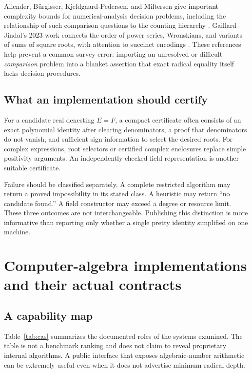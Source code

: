 \documentclass[11pt,oneside]{article}
\numberwithin{equation}{section}
\theoremstyle{definition}
\theoremstyle{remark}
\begin{document}
Allender, B\"urgisser, Kjeldgaard-Pedersen, and Miltersen give important complexity bounds for numerical-analysis decision problems, including the relationship of such comparison questions to the counting hierarchy \cite{allender}. Gaillard--Jindal's 2023 work connects the order of power series, Wronskians, and variants of sums of square roots, with attention to succinct encodings \cite{gaillard}. These references help prevent a common survey error: importing an unresolved or difficult \emph{comparison} problem into a blanket assertion that exact radical equality itself lacks decision procedures.

\subsection{What an implementation should certify}
For a candidate real denesting $E=F$, a compact certificate often consists of an exact polynomial identity after clearing denominators, a proof that denominators do not vanish, and sufficient sign information to select the desired roots. For complex expressions, root selectors or certified complex enclosures replace simple positivity arguments. An independently checked field representation is another suitable certificate.

Failure should be classified separately. A complete restricted algorithm may return a proved impossibility in its stated class. A heuristic may return ``no candidate found.'' A field constructor may exceed a degree or resource limit. These three outcomes are not interchangeable. Publishing this distinction is more informative than reporting only whether a single pretty identity simplified on one machine.

\section{Computer-algebra implementations and their actual contracts}\label{sec:cas}

\subsection{A capability map}
Table~\ref{tab:cas} summarizes the documented roles of the systems examined. The table is not a benchmark ranking and does not claim to reveal proprietary internal algorithms. A public interface that exposes algebraic-number arithmetic can be extremely useful even when it does not advertise minimum radical depth.
\end{document}
